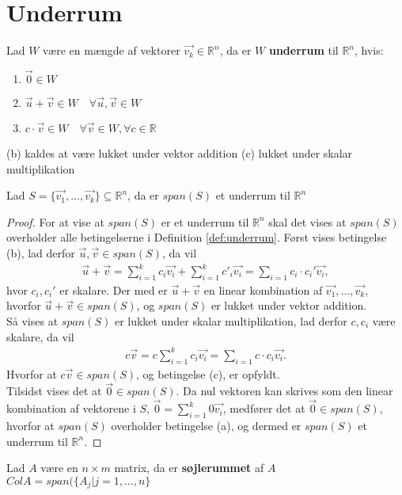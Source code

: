 \section{Underrum}
\begin{defn}
Lad $W$ være en mængde af vektorer $\vec{v_k} \in \mathds{R}^n$, da er $W$  \textbf{underrum} til $\mathds{R}^n$, hvis:
\begin{enumerate}[label=\alph*]
\item $\vec{0} \in W$
\item $\vec{u}+\vec{v} \in W \quad \forall \vec{u}, \vec{v} \in W$
\item $c \cdot \vec{v} \in W \quad \forall \vec{v} \in W, \forall c \in \mathds{R}$
\end{enumerate}
\label{def:underrum}
\end{defn}
(b) kaldes at være lukket under vektor addition (c) lukket under skalar multiplikation

\begin{stn}
Lad $S=\{\vec{v_1},...,\vec{v_k}\} \subseteq \mathds{R}^n$, da er $span(S)$ et underrum til $\mathds{R}^n$
\end{stn}
\begin{proof}
For at vise at $span(S)$ er et underrum til $\mathds{R}^n$ skal det vises at $span(S)$ overholder alle betingelserne i Definition \ref{def:underrum}.
Først vises betingelse (b), lad  derfor $\vec{u}, \vec{v} \in span(S)$, da vil 
\begin{align*}
\vec{u}+\vec{v}= \sum_{i=1}^k c_i \vec{v_i} + \sum_{i=1}^k c'_i \vec{v_i} = \sum_{i=1} c_i\cdot c_i' \vec{v_i},
\end{align*}
hvor $c_i, c_i'$ er skalare.
Der med er $\vec{u}+\vec{v}$ en linear kombination af $\vec{v_1},...,\vec{v_k}$, hvorfor $\vec{u}+\vec{v} \in span(S)$, og $span(S)$ er lukket under vektor addition.
\\ Så vises at $span(S)$ er lukket under skalar multiplikation, lad derfor $c, c_i$ være skalare, da vil
\begin{align*}
c\vec{v}= c\sum_{i=1}^k c_i \vec{v_i}  = \sum_{i=1} c \cdot c_i \vec{v_i}.
\end{align*}
Hvorfor at $c\vec{v} \in span(S)$, og betingelse (c), er opfyldt.
\\Tilsidst vises det at $\vec{0} \in span(S)$.
Da nul vektoren kan skrives som den linear kombination af vektorene i $S$, $\vec{0} = \sum_{i=1}^k 0 \vec{v_i}$, medfører det at $\vec{0} \in span(S)$, hvorfor at $span(S)$ overholder betingelse (a), og dermed er $span(S)$ et underrum til $\mathds{R}^n$.
\end{proof}

\begin{defn}
Lad $A$ være en $n\times m$ matrix, da er \textbf{søjlerummet} af $A$ $Col A = span(\{A_j | j =1,...,n\}$
\end{defn} 

